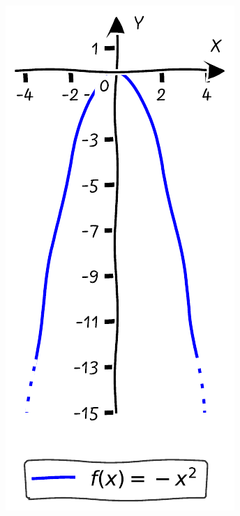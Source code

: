 \documentclass{tufte-handout}
\begin{document}
\begin{figure}[h]
\begin{minipage}{0.18\textwidth}
    \label{fig:second}
  \end{minipage}\hfill
  \begin{minipage}{0.18\textwidth}
    \includegraphics[width=\linewidth]{./graphs/quadratic_func_flipped.pdf}

\end{minipage}
\end{figure}
\end{document}
